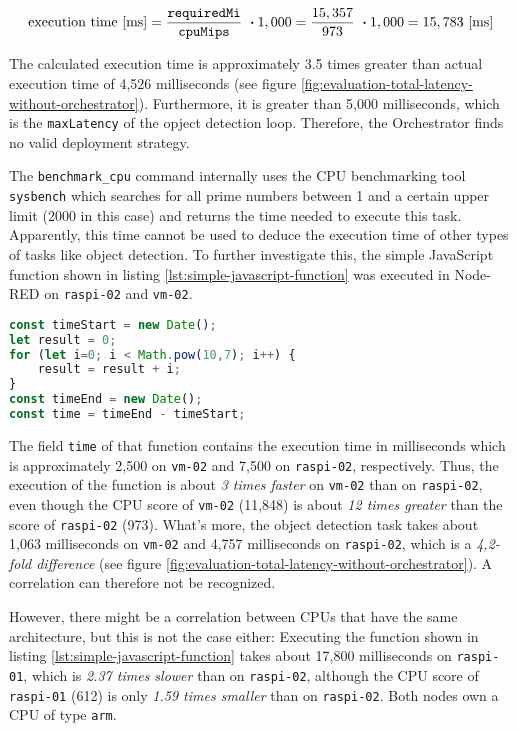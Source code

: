 \[\textrm{execution time [ms]} = \frac{\textrm{\texttt{requiredMi}}}{\textrm{\texttt{cpuMips}}}\ \boldsymbol{\cdot} 1,000 = \frac{15,357}{973}\ \boldsymbol{\cdot} 1,000 = 15,783 \textrm{ [ms]}\]

The calculated execution time is approximately 3.5 times greater than actual execution time of 4,526 milliseconds (see figure \ref{fig:evaluation-total-latency-without-orchestrator}).
Furthermore, it is greater than 5,000 milliseconds, which is the \texttt{maxLatency} of the opject detection loop. 
Therefore, the Orchestrator finds no valid deployment strategy.

The \texttt{benchmark\_cpu} command internally uses the CPU benchmarking tool \texttt{sysbench} which searches for all prime numbers between 1 and a certain upper limit (2000 in this case) and returns the time needed to execute this task.
Apparently, this time cannot be used to deduce the execution time of other types of tasks like object detection.
To further investigate this, the simple JavaScript function shown in listing \ref{lst:simple-javascript-function} was executed in Node-RED on \texttt{raspi-02} and \texttt{vm-02}.

\begin{lstlisting}[language=JavaScript,numbers=none,caption={JavaScript function which calculates a simple mathematical problem while measuring the execution time},label=lst:simple-javascript-function]
const timeStart = new Date();
let result = 0;
for (let i=0; i < Math.pow(10,7); i++) {
    result = result + i;
}
const timeEnd = new Date();
const time = timeEnd - timeStart;
\end{lstlisting}

The field \texttt{time} of that function contains the execution time in milliseconds which is approximately 2,500 on \texttt{vm-02} and 7,500 on \texttt{raspi-02}, respectively. 
Thus, the execution of the function is about \textit{3 times faster} on \texttt{vm-02} than on \texttt{raspi-02}, even though the CPU score of \texttt{vm-02} (11,848) is about \textit{12 times greater} than the score of \texttt{raspi-02} (973).
What's more, the object detection task takes about 1,063 milliseconds on \texttt{vm-02} and 4,757 milliseconds on \texttt{raspi-02}, which is a \textit{4,2-fold difference} (see figure \ref{fig:evaluation-total-latency-without-orchestrator}). A correlation can therefore not be recognized.

However, there might be a correlation between CPUs that have the same architecture, but this is not the case either:
Executing the function shown in listing \ref{lst:simple-javascript-function} takes about 17,800 milliseconds on \texttt{raspi-01}, which is \textit{2.37 times slower} than on \texttt{raspi-02}, although the CPU score of \texttt{raspi-01} (612) is only \textit{1.59 times smaller} than on \texttt{raspi-02}. Both nodes own a CPU of type \texttt{arm}.\\

